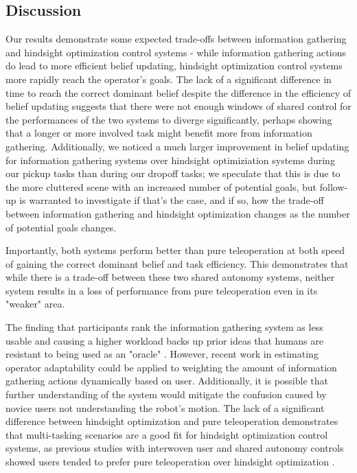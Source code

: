 \documentclass[conference]{IEEEtran}
\begin{document}
\subsection{Discussion}
Our results demonstrate some expected trade-offs between information gathering and hindsight optimization control systems - while information gathering actions do lead to more efficient belief updating, hindsight optimization control systems more rapidly reach the operator's goals. The lack of a significant difference in time to reach the correct dominant belief despite the difference in the efficiency of belief updating suggests that there were not enough windows of shared control for the performances of the two systems to diverge significantly, perhaps showing that a longer or more involved task might benefit more from information gathering. Additionally, we noticed a much larger improvement in belief updating for information gathering systems over hindsight optimiziation systems during our pickup tasks than during our dropoff tasks; we speculate that this is due to the more cluttered scene with an increased number of potential goals, but follow-up is warranted to investigate if that's the case, and if so, how the trade-off between information gathering and hindsight optimization changes as the number of potential goals changes.

Importantly, both systems perform better than pure teleoperation at both speed of gaining the correct dominant belief and task efficiency. This demonstrates that while there is a trade-off between these two shared autonomy systems, neither system results in a loss of performance from pure teleoperation even in its "weaker" area.

The finding that participants rank the information gathering system as less usable and causing a higher workload backs up prior ideas that humans are resistant to being used as an "oracle" \cite{javdani2015shared}. However, recent work in estimating operator adaptability \cite{nikolaidis2017human} could be applied to weighting the amount of information gathering actions dynamically based on user. Additionally, it is possible that further understanding of the system would mitigate the confusion caused by novice users not understanding the robot's motion. The lack of a significant difference between hindsight optimization and pure teleoperation demonstrates that multi-tasking scenarios are a good fit for hindsight optimization control systems, as previous studies with interwoven user and shared autonomy controls showed users tended to prefer pure teleoperation over hindsight optimization \cite{javdani2018shared}.
\end{document}
